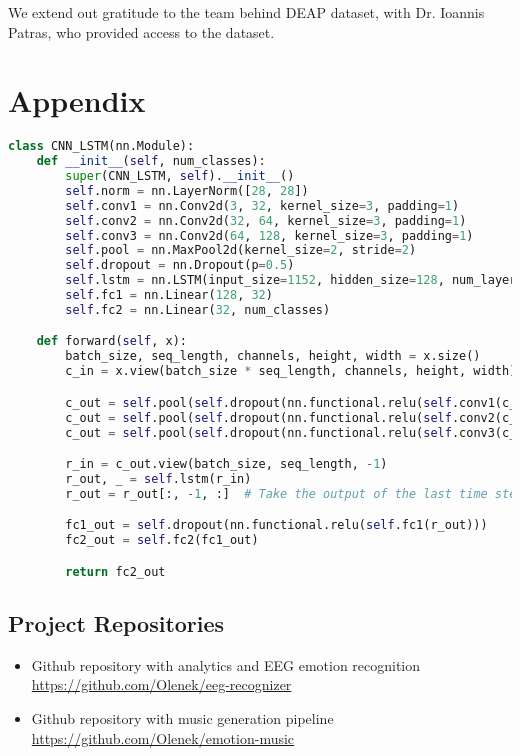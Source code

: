 \documentclass[14pt]{extreport}
\begin{document}
We extend out gratitude to the team behind DEAP dataset, with Dr. Ioannis Patras, who provided access to the dataset.

\section{Appendix} \label{section:app}

\begin{lstlisting}[language=Python, caption=CNN-LSTM architecture, label={lst:model}]
class CNN_LSTM(nn.Module):
    def __init__(self, num_classes):
        super(CNN_LSTM, self).__init__()
        self.norm = nn.LayerNorm([28, 28])
        self.conv1 = nn.Conv2d(3, 32, kernel_size=3, padding=1)
        self.conv2 = nn.Conv2d(32, 64, kernel_size=3, padding=1)
        self.conv3 = nn.Conv2d(64, 128, kernel_size=3, padding=1)
        self.pool = nn.MaxPool2d(kernel_size=2, stride=2)
        self.dropout = nn.Dropout(p=0.5)
        self.lstm = nn.LSTM(input_size=1152, hidden_size=128, num_layers=3, dropout=0.3, batch_first=True)
        self.fc1 = nn.Linear(128, 32)
        self.fc2 = nn.Linear(32, num_classes)

    def forward(self, x):
        batch_size, seq_length, channels, height, width = x.size()
        c_in = x.view(batch_size * seq_length, channels, height, width)

        c_out = self.pool(self.dropout(nn.functional.relu(self.conv1(c_in))))
        c_out = self.pool(self.dropout(nn.functional.relu(self.conv2(c_out))))
        c_out = self.pool(self.dropout(nn.functional.relu(self.conv3(c_out))))

        r_in = c_out.view(batch_size, seq_length, -1)
        r_out, _ = self.lstm(r_in)
        r_out = r_out[:, -1, :]  # Take the output of the last time step

        fc1_out = self.dropout(nn.functional.relu(self.fc1(r_out)))
        fc2_out = self.fc2(fc1_out)

        return fc2_out
\end{lstlisting}
\subsection{Project Repositories}
\begin{itemize}
    \item Github repository with analytics and EEG emotion recognition \\
    {\small \url{https://github.com/Olenek/eeg-recognizer}}
    \item Github repository with music generation pipeline \\
    {\small \url{https://github.com/Olenek/emotion-music}}
\end{itemize}
\end{document}
